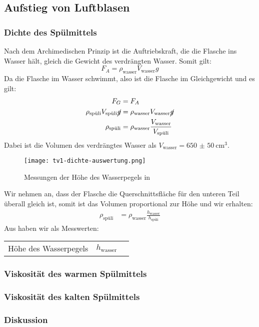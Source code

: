 \newcommand{\spuli}{\text{spüli}}
\newcommand{\wasser}{\text{wasser}}
\subsection{Aufstieg von Luftblasen}
	\subsubsection{Dichte des Spülmittels}
		Nach dem Archimedischen Prinzip ist die Auftriebskraft, die die Flasche ins Wasser hält, gleich die Gewicht des verdrängten Wasser. Somit gilt:
		\begin{equation}
			F_A = \rho_\wasser V_\wasser g
		\end{equation}
		Da die Flasche im Wasser schwimmt, also ist die Flasche im Gleichgewicht und es gilt:
		\begin{align}
			F_G &= F_A \\
			\rho_\spuli V_\spuli \cancel{g} &= \rho_\wasser V_\wasser \cancel{g} \\
			\rho_\spuli &= \rho_\wasser \frac{V_\wasser}{V_\spuli}
		\end{align}
		Dabei ist die Volumen des verdrängtes Wasser als $V_\wasser = \SI{650(50)}{\centi\meter\cubed}$.

		\begin{wrapfigure}{o}{0.4\textwidth}
			\centering
			\vspace{-1em}
			\captionsetup{width=0.4\textwidth, justification=centering}
			\texttt{[image: tv1-dichte-auswertung.png]}
			\caption{Messungen der Höhe des Wasserpegels in \tracker{}}
			\vspace{-1em}
		\end{wrapfigure}
		Wir nehmen an, dass der Flasche die Querschnittsfläche für den unteren Teil überall gleich ist, somit ist das Volumen proportional zur Höhe und wir erhalten:
		\begin{align}
			\rho_\spuli &= \rho_\wasser \frac{h_\wasser}{h_\spuli}
		\end{align}
		Aus \tracker{} haben wir als Messwerten:
		\begin{center}
			\begin{tabular}{llr}
				\toprule
				Höhe des Wasserpegels & $h_\wasser$ & \SI{}
				\bottomrule
			\end{tabular}
		\end{center}



	\subsubsection{Viskosität des warmen Spülmittels}
	\subsubsection{Viskosität des kalten Spülmittels}
	\subsubsection{Diskussion}